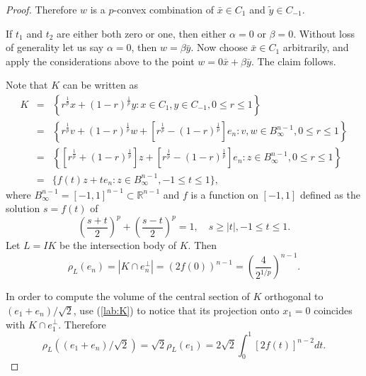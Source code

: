 \documentclass[12pt]{amsart} %
\renewcommand{\[}{\left[}
\renewcommand{\(}{\left(}
\renewcommand{\]}{\right]}
\renewcommand{\)}{\right)}
\renewcommand{\le}{\leqslant}
\renewcommand{\ge}{\geqslant}
\newcommand{\R}{\mathbb R}              %
\begin{document}
\begin{proof}
Therefore $w$ is a $p$-convex combination
 of ${\bar x}\in C_{1}$ and ${\widetilde y}\in C_{-1}$.

 If $t_1$ and $t_2$ are either both zero or one, then either $\alpha=0$ or $\beta=0$. Without loss of generality let us say $\alpha=0$, then $w = \beta {\bar y}.$ Now choose $\bar x\in C_1$ arbitrarily, and apply the considerations above to the point $w=  0 {\bar x} + \beta {\bar y}.$
 The claim follows.


Note that $K$ can be written as
\begin{eqnarray} \label{lab:K}
K &=& \left\{ r^\frac1p x+ (1-r)^\frac1p y : x\in C_{1}, y\in C_{-1},  0\le r\le 1 \right\}  \nonumber \\
&=& \left\{ r^\frac1p v+ (1-r)^\frac1p w + \[r^\frac1p -(1-r)^\frac1p \]e_n: v, w\in B_\infty^{n-1},  0\le r\le 1 \right\}  \nonumber \\
&=& \left\{ \[r^\frac1p +(1-r)^\frac1p \] z + \[r^\frac1p -(1-r)^\frac1p \]e_n : z\in B_\infty^{n-1}, 0\le r\le 1\right\} \nonumber \\
&=& \Big\{ f(t) z + te_n :  z \in B_\infty^{n-1},   -1\le t\le 1\Big\} ,
\end{eqnarray}
where  $B^{n-1}_\infty=[-1,1]^{n-1}\subset \R^{n-1}$ and $f$ is a function on $[-1,1]$ defined as the solution $s=f(t)$ of $$\(\frac{s+t}{2}\)^p + \(\frac{s-t}{2}\)^p =1, \quad s\ge|t|,-1\le t\le 1.$$
Let $L=IK$ be the intersection body of $K$. Then
$$\rho_L(e_n)= |K\cap e_n^\perp| = \left(2f(0)\right)^{n-1}=\left(\frac{4}{2^{1/p}}\right)^{n-1} .$$

In order to compute the volume of the central section of $K$ orthogonal to $(e_1+e_n)/\sqrt{2}$, use  (\ref{lab:K}) to notice that its projection onto $x_1=0$ coincides with $K\cap e_1^\perp$. Therefore
$$\rho_L((e_1+e_n)/\sqrt{2} )  = \sqrt{2}\rho_L( e_1 )=2 \sqrt{2}\int_0^1 \left[2f(t)\right]^{n-2} dt .$$





\end{proof}
\end{document}
